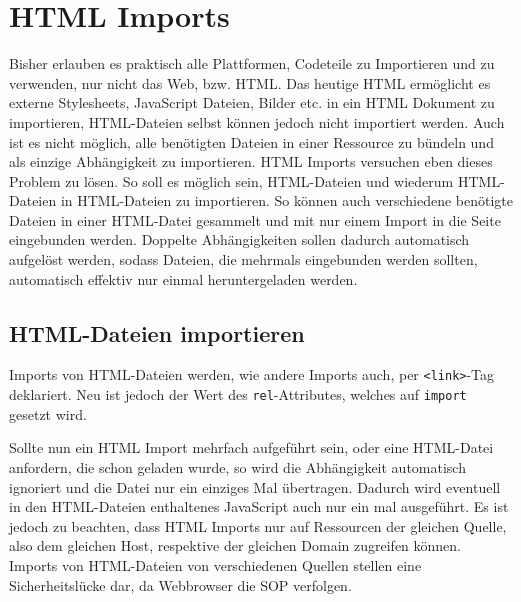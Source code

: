\section{HTML Imports}\label{html-imports}

Bisher erlauben es praktisch alle Plattformen, Codeteile zu Importieren und zu verwenden, nur nicht das Web, bzw. HTML. Das heutige HTML ermöglicht es externe Stylesheets, JavaScript Dateien, Bilder etc. in ein HTML Dokument zu importieren, HTML-Dateien selbst können jedoch nicht importiert werden. Auch ist es nicht möglich, alle benötigten Dateien in einer Ressource zu bündeln und als einzige Abhängigkeit zu importieren. HTML Imports versuchen eben dieses Problem zu lösen. So soll es möglich sein, HTML-Dateien und wiederum HTML-Dateien in HTML-Dateien zu importieren. So können auch verschiedene benötigte Dateien in einer HTML-Datei gesammelt und mit nur einem Import in die Seite eingebunden werden. Doppelte Abhängigkeiten sollen dadurch automatisch aufgelöst werden, sodass Dateien, die mehrmals eingebunden werden sollten, automatisch effektiv nur einmal heruntergeladen werden.


\subsection{HTML-Dateien importieren}\label{html-dateien-importieren}

Imports von HTML-Dateien werden, wie andere Imports auch, per \texttt{\textless{}link\textgreater{}}-Tag deklariert. Neu ist jedoch der Wert des \texttt{rel}-Attributes, welches auf \texttt{import} gesetzt wird. \cite[S. 139-147]{citeulike:13844975}

\begin{Shaded}
\begin{Highlighting}[]
  \KeywordTok{>}
\end{Highlighting}
\end{Shaded}

Sollte nun ein HTML Import mehrfach aufgeführt sein, oder eine HTML-Datei anfordern, die schon geladen wurde, so wird die Abhängigkeit automatisch ignoriert und die Datei nur ein einziges Mal übertragen. Dadurch wird eventuell in den HTML-Dateien enthaltenes JavaScript auch nur ein mal ausgeführt. Es ist jedoch zu beachten, dass HTML Imports nur auf Ressourcen der gleichen Quelle, also dem gleichen Host, respektive der gleichen Domain zugreifen können. Imports von HTML-Dateien von verschiedenen Quellen stellen eine Sicherheitslücke dar, da Webbrowser die SOP verfolgen.

